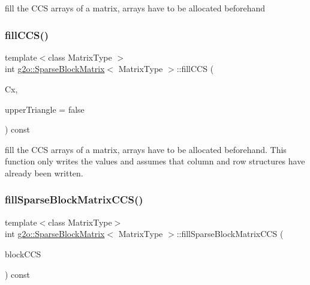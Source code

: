 fill the C\+CS arrays of a matrix, arrays have to be allocated beforehand \mbox{\label{classg2o_1_1_sparse_block_matrix_ac01f380ada64511737cb97631d39a9e8}} 
\subsubsection{\texorpdfstring{fill\+C\+C\+S()}{fillCCS()}\hspace{0.1cm}{\footnotesize\ttfamily [2/2]}}
{\footnotesize\ttfamily template$<$class Matrix\+Type $>$ \\
int \mbox{\hyperlink{classg2o_1_1_sparse_block_matrix}{g2o\+::\+Sparse\+Block\+Matrix}}$<$ Matrix\+Type $>$\+::fill\+C\+CS (\begin{DoxyParamCaption}\item[{double $\ast$}]{Cx,  }\item[{bool}]{upper\+Triangle = {\ttfamily false} }\end{DoxyParamCaption}) const}

fill the C\+CS arrays of a matrix, arrays have to be allocated beforehand. This function only writes the values and assumes that column and row structures have already been written. \mbox{\label{classg2o_1_1_sparse_block_matrix_a783a9c976391f0c698866e34eeef43f5}} 
\subsubsection{\texorpdfstring{fill\+Sparse\+Block\+Matrix\+C\+C\+S()}{fillSparseBlockMatrixCCS()}}
{\footnotesize\ttfamily template$<$class Matrix\+Type$>$ \\
int \mbox{\hyperlink{classg2o_1_1_sparse_block_matrix}{g2o\+::\+Sparse\+Block\+Matrix}}$<$ Matrix\+Type $>$\+::fill\+Sparse\+Block\+Matrix\+C\+CS (\begin{DoxyParamCaption}\item[{\mbox{\hyperlink{classg2o_1_1_sparse_block_matrix_c_c_s}{Sparse\+Block\+Matrix\+C\+CS}}$<$ Matrix\+Type $>$ \&}]{block\+C\+CS }\end{DoxyParamCaption}) const}

